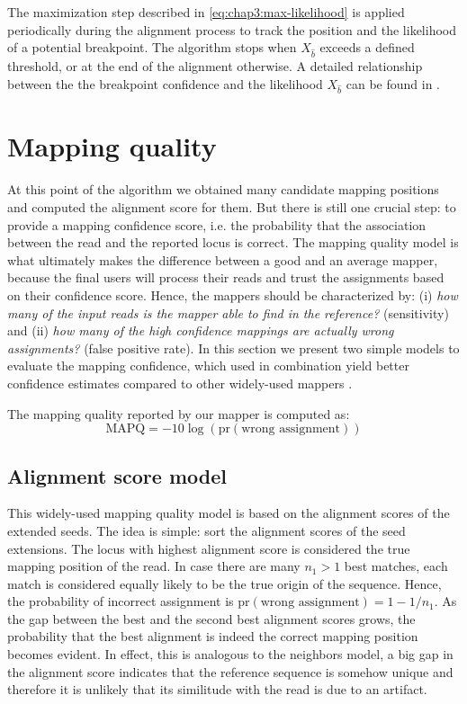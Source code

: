 The maximization step described in \eqref{eq:chap3:max-likelihood} is
applied periodically during the alignment process to track the
position and the likelihood of a potential breakpoint. The algorithm
stops when $X_{\hat{b}}$ exceeds a defined threshold, or at the end of
the alignment otherwise. A detailed relationship between the
the breakpoint confidence and the likelihood $X_{\hat{b}}$ can be
found in \cite{breakpoint}.

\section{Mapping quality}
At this point of the algorithm we obtained many candidate mapping
positions and computed the alignment score for them. But there is
still one crucial step: to provide a mapping confidence score,
i.e. the probability that the association between the read and the
reported locus is correct. The mapping quality model is what
ultimately makes the difference between a good and an average mapper,
because the final users will process their reads and trust the
assignments based on their confidence score. Hence, the mappers should
be characterized by: (i) {\em how many of the input reads is the mapper
able to find in the reference?} (sensitivity) and (ii) {\em how many
of the high confidence mappings are actually wrong assignments?}
(false positive rate). In this section we present two simple models to
evaluate the mapping confidence, which used in combination yield
better confidence estimates compared to other widely-used mappers
\cite{bwa,bowtie}.

The mapping quality reported by our mapper is computed as:
\begin{equation}
  \label{eq:chap3:mapq}
  \mbox{MAPQ} = -10\log\left(\mbox{pr}(\mbox{wrong assignment})\right)
\end{equation}

\subsection{Alignment score model}
This widely-used mapping quality model is based on the alignment
scores of the extended seeds. The idea is simple: sort the alignment
scores of the seed extensions. The locus with highest alignment score
is considered the true mapping position of the read. In case there are
many $n_1 > 1$ best matches, each match is considered equally likely
to be the true origin of the sequence. Hence, the probability of
incorrect assignment is $\mbox{pr}(\mbox{wrong assignment}) =
1-1/n_1$. As the gap between the best and the second best alignment
scores grows, the probability that the best alignment is indeed the
correct mapping position becomes evident. In effect, this is analogous
to the neighbors model, a big gap in the alignment score indicates
that the reference sequence is somehow unique and therefore it is
unlikely that its similitude with the read is due to an artifact.

